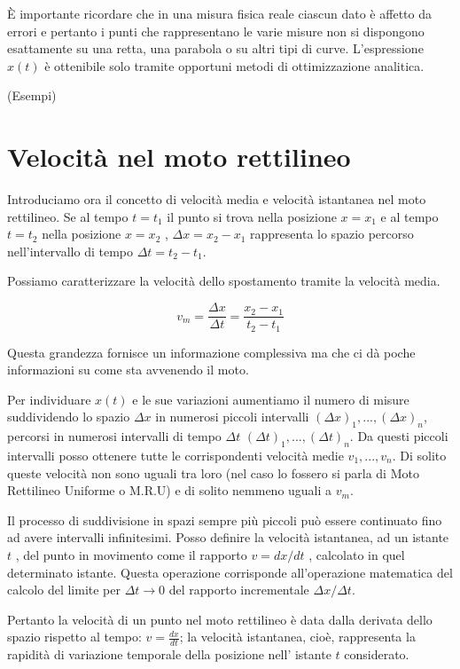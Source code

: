 \documentclass[class=book, crop=false, oneside, 12pt]{standalone}
\begin{document}
È importante ricordare che in una misura fisica reale ciascun dato è
affetto da errori e pertanto i punti che rappresentano le varie misure
non si dispongono esattamente su una retta, una parabola o su altri tipi
di curve. L'espressione \(x(t)\) è ottenibile solo tramite opportuni
metodi di ottimizzazione analitica.

(Esempi)

\section{Velocità nel moto rettilineo}
Introduciamo ora il concetto di velocità media e velocità istantanea nel
moto rettilineo. Se al tempo \(t = t_1\) il punto si trova nella posizione \(x = x_1\) e al
tempo \(t = t_2\) nella posizione \(x = x_2\) ,
\(\Delta x = x_2 - x_1\) rappresenta lo spazio percorso nell'intervallo
di tempo \(\Delta t = t_2 - t_1\).

Possiamo caratterizzare la velocità dello spostamento tramite la
velocità media.

\begin{equation}
v_m = \frac {\Delta x} {\Delta t} = \frac {x_2 - x_1} {t_2 - t_1}
\end{equation}

Questa grandezza fornisce un informazione complessiva ma che ci dà poche
informazioni su come sta avvenendo il moto.

Per individuare \(x(t)\) e le sue variazioni aumentiamo il numero di
misure suddividendo lo spazio \(\Delta x\) in numerosi piccoli
intervalli \((\Delta x)_1,...,(\Delta x)_n\), percorsi in numerosi
intervalli di tempo \(\Delta t\) \((\Delta t)_1,...,(\Delta t)_n\). Da
questi piccoli intervalli posso ottenere tutte le corrispondenti
velocità medie \(v_1,...,v_n\). Di solito queste velocità non sono
uguali tra loro (nel caso lo fossero si parla di Moto Rettilineo
Uniforme o M.R.U) e di solito nemmeno uguali a \(v_m\).

Il processo di suddivisione in spazi sempre più piccoli può essere
continuato fino ad avere intervalli infinitesimi. Posso definire la
velocità istantanea, ad un istante \(t\) , del punto in movimento come
il rapporto \(v = dx/dt\) , calcolato in quel determinato istante.
Questa operazione corrisponde all'operazione matematica del calcolo del
limite per \(\Delta t \rightarrow 0\) del rapporto incrementale
\(\Delta x / \Delta t\).

Pertanto la velocità di un punto nel moto rettilineo è data dalla
derivata dello spazio rispetto al tempo: \(v = \frac {dx} {dt}\); la
velocità istantanea, cioè, rappresenta la rapidità di variazione
temporale della posizione nell' istante \(t\) considerato.
\end{document}
